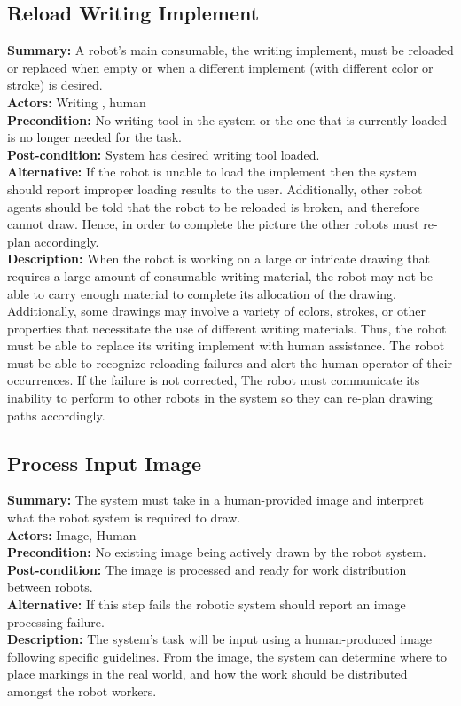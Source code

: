 \subsection{Reload Writing Implement}
\textbf{Summary:} A robot's main consumable, the writing implement, must be reloaded or replaced when empty or when a different implement (with different color or stroke) is desired. \\
\textbf{Actors:}  Writing , human \\
\textbf{Precondition:} No writing tool in the system or the one that is currently loaded is no longer needed for the task. \\
\textbf{Post-condition:} System has desired writing tool loaded. \\
\textbf{Alternative:} If the robot is unable to load the implement then the system should report improper loading results to the user. Additionally, other robot agents should be told that the robot to be reloaded is broken, and therefore cannot draw. Hence, in order to complete the picture the other robots must re-plan accordingly. \\
\textbf{Description:} When the robot is working on a large or intricate drawing that requires a large amount of consumable writing material, the robot may not be able to carry enough material to complete its allocation of the drawing. Additionally, some drawings may involve a variety of colors, strokes, or other properties that necessitate the use of different writing materials. Thus, the robot must be able to replace its writing implement with human assistance. The robot must be able to recognize reloading failures and alert the human operator of their occurrences. If the failure is not corrected, The robot must communicate its inability to perform to other robots in the system so they can re-plan drawing paths accordingly. \\

\subsection{Process Input Image}
\textbf{Summary:} The system must take in a human-provided image and interpret what the robot system is required to draw. \\
\textbf{Actors:} Image, Human \\
\textbf{Precondition:}  No existing image being actively drawn by the robot system. \\
\textbf{Post-condition:} The image is processed and ready for work distribution between robots. \\
\textbf{Alternative:} If this step fails the robotic system should report an image processing failure. \\
\textbf{Description:} The system's task will be input using a human-produced image following specific guidelines. From the image, the system can determine where to place markings in the real world, and how the work should be distributed amongst the robot workers. \\

